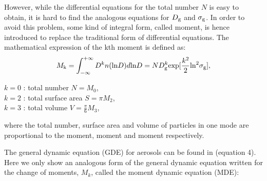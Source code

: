 \documentclass[12pt, fullpage]{uiucthesis2009}
\begin{document}
		However, while the differential equations for the total number $N$ is easy to obtain, it is hard to find the analogous equations for $D_{\rm g}$ and $\sigma_{\rm g}$. In order to avoid this problem, some kind of integral form, called moment, is hence introduced to replace the traditional form of differential equations. The mathematical expression of the kth moment is defined as:
		\begin{align}
		M_\text{k} = \int_{-\infty}^{+\infty}D^kn(\text{ln}D)d\text{ln}D = ND_{\rm g}^k\text{exp}[\frac{k^2}{2}\text{ln}^2\sigma_{\rm g}],
		\end{align}
		\begin{flushleft}
			$k = 0$ : total number $N = M_0$, \\
			$k = 2$ : total surface area $S = \pi M_2$, \\
			$k = 3$ : total volume $V = \frac{\pi}{6}M_3$, \\
		\end{flushleft}
		where the total number, surface area and volume of particles in one mode are proportional to the  moment,  moment and  moment respectively. 
		
		The general dynamic equation (GDE) for aerosols can be found in \citet{whitby1997} (equation 4). Here we only show an analogous form of the general dynamic equation written for the change of moments, $M_{k}$, called the moment dynamic equation (MDE):
		
\end{document}
